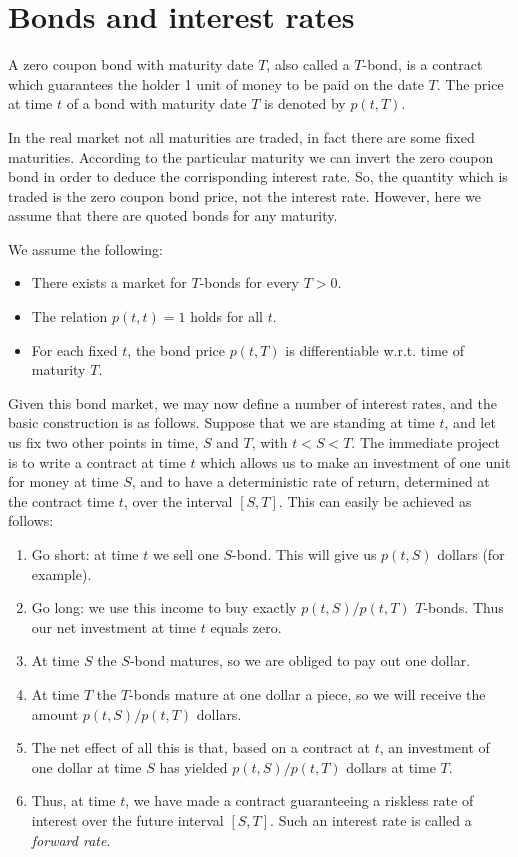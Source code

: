 \section{Bonds and interest rates} %
\begin{definition}
    A zero coupon bond with maturity date $T$, also called a $T$-bond, is a contract which guarantees the holder 1 unit of money to be paid on the date $T$. The price at time $t$ of a bond with maturity date $T$ is denoted by $p(t, T)$.
\end{definition}
In the real market not all maturities are traded, in fact there are some fixed maturities. According to the particular maturity we can invert the zero coupon bond in order to deduce the corrisponding interest rate. So, the quantity which is traded is the zero coupon bond price, not the interest rate. However, here we assume that there are quoted bonds for any maturity.
\begin{assumption}
    We assume the following:
    \begin{itemize}
        \item There exists a market for $T$-bonds for every $T > 0$.
        \item The relation $p(t, t) = 1$ holds for all $t$.
        \item For each fixed $t$, the bond price $p(t, T)$ is differentiable w.r.t. time of maturity $T$.
    \end{itemize}
\end{assumption}
Given this bond market, we may now define a number of interest rates, and the basic construction is as follows. Suppose that we are standing at time $t$, and let us fix two other points in time, $S$ and $T$, with $t < S < T$. The immediate project is to write a contract at time $t$ which allows us to make an investment of one unit for money at time $S$, and to have a deterministic rate of return, determined at the contract time $t$, over the interval $[S,T]$. This can easily be achieved as follows:
\begin{enumerate}
    \item Go short: at time $t$ we sell one $S$-bond. This will give us $p(t,S)$ dollars (for example).
    \item Go long: we use this income to buy exactly $p(t,S)/p(t,T)$ $T$-bonds. Thus our net investment at time $t$ equals zero.
    \item At time $S$ the $S$-bond matures, so we are obliged to pay out one dollar.
    \item At time $T$ the $T$-bonds mature at one dollar a piece, so we will receive the amount $p(t, S)/p(t, T)$ dollars.
    \item The net effect of all this is that, based on a contract at $t$, an investment of one dollar at time $S$ has yielded $p(t, S)/p(t, T)$ dollars at time $T$.
    \item Thus, at time $t$, we have made a contract guaranteeing a riskless rate of interest over the future interval $[S,T]$. Such an interest rate is called a \emph{forward rate}.
\end{enumerate}
